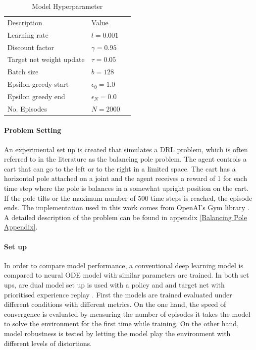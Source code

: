 \documentclass[10pt]{reportMaster}
\begin{document}
\begin{table}


\label{tab:model-hyperparameter}
\begin{tabular}{lll}
Description              & Value   &  \\ \cline{1-2}
Learning rate            & $l=0.001$ &  \\
Discount factor          & $\gamma =0.95$  &  \\
Target net weight update & $ \tau=0.05$  &  \\
Batch size               & $b=128$     &  \\
Epsilon greedy start    & $\epsilon_{0}=1.0$   &  \\
Epsilon greedy end       & $\epsilon_{N}=0.0$   & \\
No. Episodes       & $N = 2000$   & \\
\end{tabular}
\centering
\caption{Model Hyperparameter}
\end{table}

\paragraph{Problem Setting} An experimental set up is created that simulates a \ac{DRL} problem, which is often referred to in the literature as the balancing pole \cite{barto1983neuronlike} problem. The agent controls a cart that can go to the left or to the right in a limited space. The cart has a horizontal pole attached on a joint and the agent receives a reward of 1 for each time step where the pole is balances in a somewhat upright position on the cart. If the pole tilts or the maximum number of 500 time steps is reached, the episode ends. The implementation used in this work comes from OpenAI's Gym library \cite{gymref}. A detailed description of the problem can be found in appendix \ref{Balancing Pole Appendix}.

\paragraph{Set up} In order to compare model performance, a conventional deep learning model is compared to neural ODE model with similar parameters are trained. In both set ups, are dual model set up is used with a policy and and target net \cite{hasselt2010double} with prioritised experience replay \cite{schaul2015prioritized}. First the models are trained evaluated under different conditions with different metrics. On the one hand, the speed of convergence is evaluated by measuring the number of episodes it takes the model to solve the environment for the first time while training. On the other hand, model robustness is tested by letting the model play the environment with different levels of distortions. 
\end{document}
